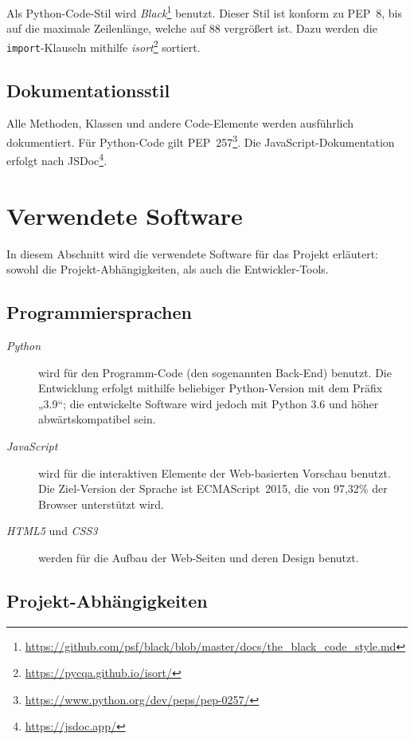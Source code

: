 \documentclass{article}
\begin{document}
Als Python-Code-Stil wird \textit{Black}\footnote{\url{https://github.com/psf/black/blob/master/docs/the_black_code_style.md}} benutzt. Dieser Stil ist konform zu PEP~8, bis auf die maximale Zeilenlänge, welche auf 88 vergrößert ist. Dazu werden die \texttt{import}-Klauseln mithilfe \textit{isort}\footnote{\url{https://pycqa.github.io/isort/}} sortiert.

\subsection{Dokumentationsstil}

Alle Methoden, Klassen und andere Code-Elemente werden ausführlich dokumentiert. Für Python-Code gilt PEP~257\footnote{\url{https://www.python.org/dev/peps/pep-0257/}}. Die JavaScript-Dokumentation erfolgt nach JSDoc\footnote{\url{https://jsdoc.app/}}.

\section{Verwendete Software}

In diesem Abschnitt wird die verwendete Software für das Projekt erläutert: sowohl die Projekt-Abhängigkeiten, als auch die Entwickler-Tools.

\subsection{Programmiersprachen}

\begin{description}

\item [\textit{Python}] wird für den Programm-Code (den sogenannten Back-End) benutzt. Die Entwicklung erfolgt mithilfe beliebiger Python-Version mit dem Präfix „3.9“; die entwickelte Software wird jedoch mit Python 3.6 und höher abwärtskompatibel sein.

\item [\textit{JavaScript}] wird für die interaktiven Elemente der Web-basierten Vorschau benutzt. Die Ziel-Version der Sprache ist ECMAScript~2015, die von 97,32\% der Browser unterstützt wird.

\item [\textit{HTML5} und \textit{CSS3}] werden für die Aufbau der Web-Seiten und deren Design benutzt.
\end{description}

\subsection{Projekt-Abhängigkeiten}
\end{document}
